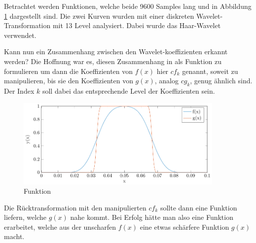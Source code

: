 Betrachtet werden Funktionen, welche beide 9600 Samples lang und in Abbildung \ref{deconvolve:1d} dargestellt sind.
Die zwei Kurven wurden mit einer diskreten Wavelet-Transformation mit 13 Level analysiert.
Dabei wurde das Haar-Wavelet verwendet.

Kann nun ein Zusammenhang zwischen den Wavelet-koeffizienten erkannt werden?
Die Hoffnung war es, diesen Zusammenhang in als Funktion zu formulieren um dann die Koeffizienten von $f(x)$ hier $cf_k$ genannt, soweit zu manipulieren, bis sie den Koeffizienten von $g(x)$, analog $cg_k$, genug ähnlich sind.
Der Index $k$ soll dabei das entsprechende Level der Koeffizienten sein.
\begin{figure}[h]
\centering
\includegraphics[width=0.9\textwidth]{./papers/deconvolve/pictures/1d.pdf}
\caption{Funktion\label{deconvolve:1d}}
\end{figure}
Die Rücktransformation mit den manipulierten $cf_k$ sollte dann eine Funktion liefern, welche $g(x)$ nahe kommt.
Bei Erfolg hätte man also eine Funktion erarbeitet, welche aus der unscharfen $f(x)$ eine etwas schärfere Funktion $g(x)$ macht. 


